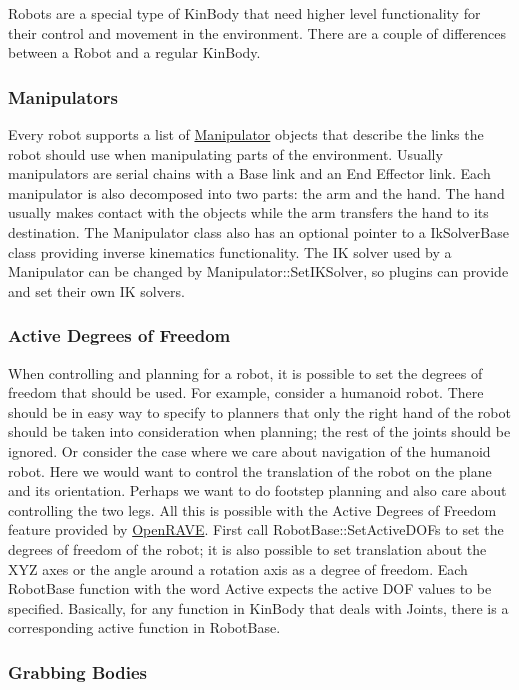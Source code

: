 Robots are a special type of KinBody that need higher level functionality for their control and movement in the environment. There are a couple of differences between a Robot and a regular KinBody.\hypertarget{arch__robot_arch_robot_manipulator}{}\subsubsection{Manipulators}\label{arch__robot_arch_robot_manipulator}
Every robot supports a list of \hyperlink{classOpenRAVE_1_1RobotBase_1_1Manipulator}{Manipulator} objects that describe the links the robot should use when manipulating parts of the environment. Usually manipulators are serial chains with a Base link and an End Effector link. Each manipulator is also decomposed into two parts: the arm and the hand. The hand usually makes contact with the objects while the arm transfers the hand to its destination. The Manipulator class also has an optional pointer to a IkSolverBase class providing inverse kinematics functionality. The IK solver used by a Manipulator can be changed by Manipulator::SetIKSolver, so plugins can provide and set their own IK solvers.\hypertarget{arch__robot_arch_robot_activedof}{}\subsubsection{Active Degrees of Freedom}\label{arch__robot_arch_robot_activedof}
When controlling and planning for a robot, it is possible to set the degrees of freedom that should be used. For example, consider a humanoid robot. There should be in easy way to specify to planners that only the right hand of the robot should be taken into consideration when planning; the rest of the joints should be ignored. Or consider the case where we care about navigation of the humanoid robot. Here we would want to control the translation of the robot on the plane and its orientation. Perhaps we want to do footstep planning and also care about controlling the two legs. All this is possible with the Active Degrees of Freedom feature provided by \hyperlink{namespaceOpenRAVE}{OpenRAVE}. First call RobotBase::SetActiveDOFs to set the degrees of freedom of the robot; it is also possible to set translation about the XYZ axes or the angle around a rotation axis as a degree of freedom. Each RobotBase function with the word Active expects the active DOF values to be specified. Basically, for any function in KinBody that deals with Joints, there is a corresponding active function in RobotBase.\hypertarget{arch__robot_arch_robot_grabbing}{}\subsubsection{Grabbing Bodies}\label{arch__robot_arch_robot_grabbing}
